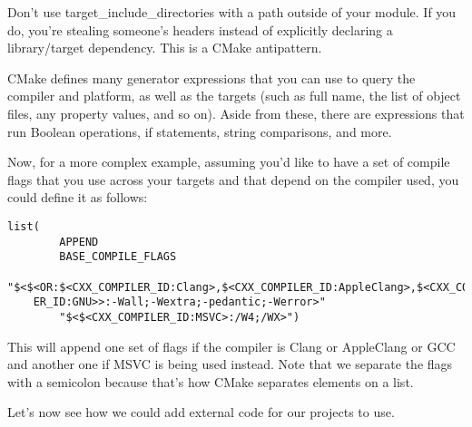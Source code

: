 \begin{tcolorbox}[colback=blue!5!white,colframe=blue!75!black, title=Note]
\hspace*{0.7cm}Don't use target\_include\_directories with a path outside of your module. If you do, you're stealing someone's headers instead of explicitly declaring a library/target dependency. This is a CMake antipattern.
\end{tcolorbox}

CMake defines many generator expressions that you can use to query the compiler and platform, as well as the targets (such as full name, the list of object files, any property values, and so on). Aside from these, there are expressions that run Boolean operations, if statements, string comparisons, and more.

Now, for a more complex example, assuming you'd like to have a set of compile flags that you use across your targets and that depend on the compiler used, you could define it as follows:

\begin{lstlisting}[style=styleCMake]
list(
		APPEND
		BASE_COMPILE_FLAGS
	"$<$<OR:$<CXX_COMPILER_ID:Clang>,$<CXX_COMPILER_ID:AppleClang>,$<CXX_COMPIL
	ER_ID:GNU>>:-Wall;-Wextra;-pedantic;-Werror>"
		"$<$<CXX_COMPILER_ID:MSVC>:/W4;/WX>")
\end{lstlisting}

This will append one set of flags if the compiler is Clang or AppleClang or GCC and another one if MSVC is being used instead. Note that we separate the flags with a semicolon because that's how CMake separates elements on a list.

Let's now see how we could add external code for our projects to use.








